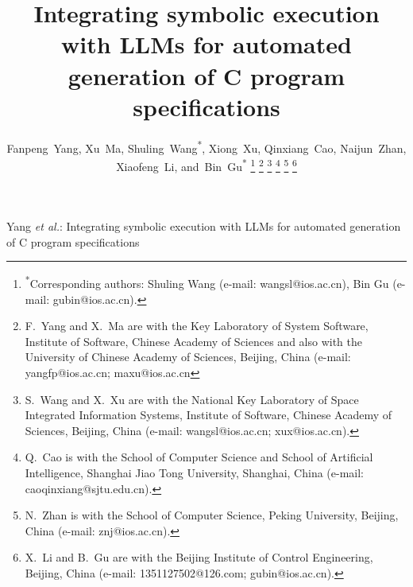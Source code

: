 \documentclass[lettersize,journal]{IEEEtran}
\begin{document}
\title{Integrating symbolic execution with LLMs for automated generation of C program specifications}

\author{Fanpeng~Yang,
        Xu~Ma,
        Shuling~Wang\textsuperscript{*},
        Xiong~Xu,
        Qinxiang~Cao,
        Naijun~Zhan,
        Xiaofeng~Li,
        and~Bin~Gu\textsuperscript{*}%
\thanks{\textsuperscript{*}Corresponding authors: Shuling Wang (e-mail: wangsl@ios.ac.cn), Bin Gu (e-mail: gubin@ios.ac.cn).}%
\thanks{F.~Yang and X.~Ma are  with the Key Laboratory of System Software, Institute of
Software, Chinese Academy of Sciences  and also with the University of Chinese Academy
of Sciences, Beijing, China
(e-mail: yangfp@ios.ac.cn; maxu@ios.ac.cn}
\thanks{S.~Wang and X.~Xu are with  the National Key
Laboratory of Space Integrated Information Systems,  Institute of Software,
Chinese Academy of Sciences, Beijing, China
(e-mail: wangsl@ios.ac.cn; xux@ios.ac.cn).}%
\thanks{Q.~Cao is with the School of Computer Science and School of Artificial
Intelligence, Shanghai Jiao Tong University, Shanghai, China
(e-mail: caoqinxiang@sjtu.edu.cn).}%
\thanks{N.~Zhan is with the School of Computer Science, Peking University,
Beijing, China (e-mail: znj@ios.ac.cn).}%
\thanks{X.~Li and B.~Gu are with the Beijing Institute of Control Engineering,
Beijing, China (e-mail: 1351127502@126.com; gubin@ios.ac.cn).}}

%
{Yang \MakeLowercase{\textit{et al.}}: Integrating symbolic execution with LLMs for automated generation of C program specifications}

\maketitle
\end{document}

